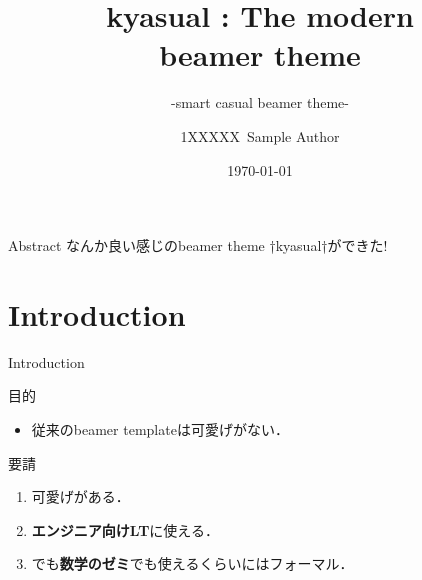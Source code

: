 \documentclass[aspectratio=1610,14pt]{beamer}
\title{%
    kyasual : The modern\\ beamer theme
}
\subtitle{
    -smart casual beamer theme-
}
\author{%
    1XXXXX\ Sample Author
}
\institute[Sample Univ.]{%
    Sample Univ. 
}
\date{%
    \today
}
\begin{document}
%
%
\begin{frame}
\maketitle 
\end{frame}

\begin{frame}[fragile]{Abstract}
    なんか良い感じのbeamer theme †\alert{kyasual}†ができた!
\end{frame}

\section{Introduction}

\begin{frame}
    \tableofcontents[currentsection]
\end{frame}

\begin{frame}{Introduction}
    \begin{textblock}{目的}
        \begin{itemize}
        \item{従来のbeamer templateは可愛げがない．}
        \end{itemize}
    \end{textblock}
    \begin{textblock}{要請}
        \begin{enumerate}
            \item{\alert{可愛げがある．}}
            \item{\textbf{エンジニア向けLT}に使える．}
            \item{でも\textbf{数学のゼミ}でも使えるくらいには\alert{フォーマル}．}
                \begin{itemize}
                \end{itemize}
        \end{enumerate}
    \end{textblock}
\end{frame}
\end{document}

